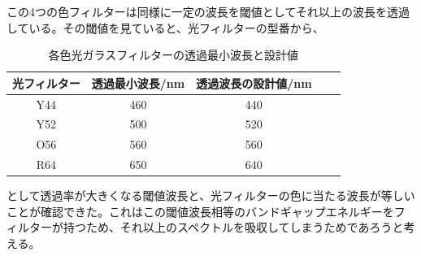 \documentclass[11pt,a4j]{jsarticle}
\begin{document}
 この4つの色フィルターは同様に一定の波長を閾値としてそれ以上の波長を透過している。その閾値を見ていると、光フィルターの型番から、
 \begin{table}[htb]
  \begin{center}
    \caption{各色光ガラスフィルターの透過最小波長と設計値}
    \begin{tabular}{ccccc} \toprule
光フィルター & 透過最小波長/nm & 透過波長の設計値/nm \\ \midrule
Y44 & 460 & 440 \\
Y52 & 500 &520 \\
O56 & 560 & 560 \\
R64 & 650 & 640 \\ \bottomrule
    \end{tabular}
    \label{tab:price}
  \end{center}
\end{table}
として透過率が大きくなる閾値波長と、光フィルターの色に当たる波長が等しいことが確認できた。これはこの閾値波長相等のバンドギャップエネルギーをフィルターが持つため、それ以上のスペクトルを吸収してしまうためであろうと考える。
  
  \clearpage
  
\end{document}
